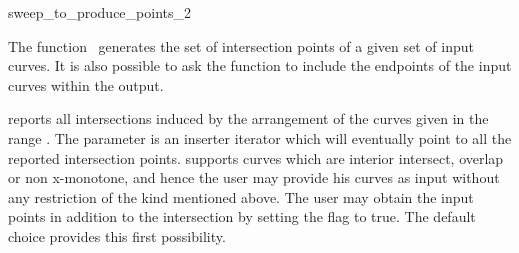 

\begin{ccRefFunction}[CGAL::]{sweep_to_produce_points_2}  %


\ccDefinition
  
The function \ccRefName\ generates the set of intersection points of a
given set of input curves. It is also possible to ask the function to
include the endpoints of the input curves within the output.


   {reports all intersections induced by the arrangement of the curves
   given in the range \ccStyle{[curves_begin, curves_end)}. The
   parameter  is an inserter iterator which 
   will eventually point to all the reported intersection points. 
    supports
   curves which are interior intersect, overlap or non x-monotone, and
   hence the user may provide his curves as input without any
   restriction of the kind mentioned above. 
   The user may obtain the input points in addition to the intersection 
   by setting the flag  to true. 
   The default choice provides this first possibility.}

\ccRequirements

\ccSeeAlso
{} \\



\end{ccRefFunction}
